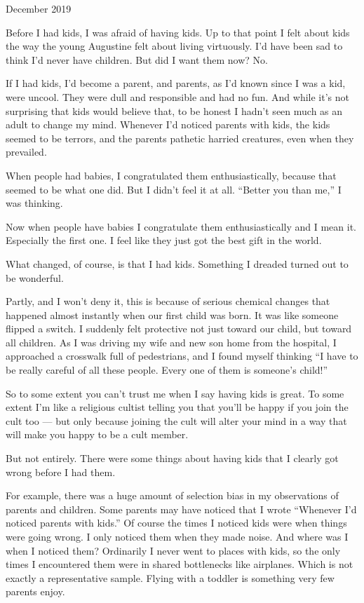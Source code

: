 December 2019

Before I had kids, I was afraid of having kids. Up to that point I felt
about kids the way the young Augustine felt about living virtuously. I'd
have been sad to think I'd never have children. But did I want them now?
No.~

If I had kids, I'd become a parent, and parents, as I'd known since I
was a kid, were uncool. They were dull and responsible and had no fun.
And while it's not surprising that kids would believe that, to be honest
I hadn't seen much as an adult to change my mind. Whenever I'd noticed
parents with kids, the kids seemed to be terrors, and the parents
pathetic harried creatures, even when they prevailed.

When people had babies, I congratulated them enthusiastically, because
that seemed to be what one did. But I didn't feel it at all. ``Better
you than me,'' I was thinking.

Now when people have babies I congratulate them enthusiastically and I
mean it. Especially the first one. I feel like they just got the best
gift in the world.

What changed, of course, is that I had kids. Something I dreaded turned
out to be wonderful.

Partly, and I won't deny it, this is because of serious chemical changes
that happened almost instantly when our first child was born. It was
like someone flipped a switch. I suddenly felt protective not just
toward our child, but toward all children. As I was driving my wife and
new son home from the hospital, I approached a crosswalk full of
pedestrians, and I found myself thinking ``I have to be really careful
of all these people. Every one of them is someone's child!''

So to some extent you can't trust me when I say having kids is great. To
some extent I'm like a religious cultist telling you that you'll be
happy if you join the cult too --- but only because joining the cult
will alter your mind in a way that will make you happy to be a cult
member.

But not entirely. There were some things about having kids that I
clearly got wrong before I had them.

For example, there was a huge amount of selection bias in my
observations of parents and children. Some parents may have noticed that
I wrote ``Whenever I'd noticed parents with kids.'' Of course the times
I noticed kids were when things were going wrong. I only noticed them
when they made noise. And where was I when I noticed them? Ordinarily I
never went to places with kids, so the only times I encountered them
were in shared bottlenecks like airplanes. Which is not exactly a
representative sample. Flying with a toddler is something very few
parents enjoy.

